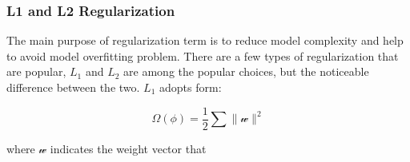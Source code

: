 \subsubsection{L1 and L2 Regularization}

The main purpose of regularization term is to reduce model complexity and help to avoid model overfitting problem. There are a few types of regularization that are popular, $L_1$ and $L_2$ are among the popular choices, but the noticeable difference between the two. $L_1$ adopts form:

\begin{equation}
   \Omega(\phi) = \frac {1}{2} \sum \parallel \mathcal{w} \parallel^2
\end{equation}

where $\mathcal{w}$ indicates the weight vector that 